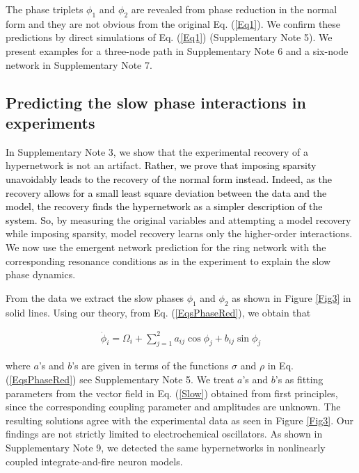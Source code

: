 \documentclass[12pt]{article}
\theoremstyle{plain}
\theoremstyle{definition}
\theoremstyle{remark}
\theoremstyle{remark}
\begin{document}
The phase triplets $\phi_1$ and  $\phi_2$ are  revealed from phase reduction in the normal form and  they are not obvious from the original Eq. (\ref{Eq1}). We confirm these  predictions by direct simulations of  Eq. (\ref{Eq1}) ({Supplementary Note 5}). We present examples for a three-node path in Supplementary Note 6 and a six-node network in Supplementary Note 7.


\subsection*{Predicting the slow phase interactions in experiments}

In {Supplementary Note 3}, we show that the experimental recovery of a hypernetwork is not an artifact. \textcolor{black}{Rather, we prove that imposing sparsity unavoidably leads to the recovery of the normal form instead. Indeed, as the recovery allows for a small least square deviation between the data and the model, the recovery finds the hypernetwork as a simpler description of the system. So,} by measuring the original variables and attempting a model recovery while imposing sparsity,  model recovery learns only the higher-order interactions. We now use the emergent network prediction for the ring network with the corresponding resonance conditions as in the experiment to explain the slow phase dynamics.

From the data we  extract the slow phases $\phi_1$ and $\phi_2$ as shown in Figure \ref{Fig3} in solid lines. Using our theory, from Eq. (\ref{EqsPhaseRed}), we obtain that
\begin{linenomath}
\begin{eqnarray}\label{Slow}
\dot{\phi}_i = \Omega_i + \sum_{j=1}^2 a_{ij} \cos \phi_j +  b_{ij} \sin \phi_j
\end{eqnarray}
\end{linenomath}
where  $a$'s and $b$'s are given in terms of the functions $\sigma$ and $\rho$ in Eq. (\ref{EqsPhaseRed}) see {Supplementary Note 5}.  We treat $a$'s  and $b$'s as fitting parameters from the vector field in Eq. (\ref{Slow}) obtained from first principles, since the corresponding coupling parameter and amplitudes are unknown. The resulting solutions agree  with the experimental data as seen in Figure \ref{Fig3}.  {\color{black} Our findings are not strictly limited to  electrochemical oscillators. As shown in  Supplementary Note 9, we detected the same hypernetworks in  nonlinearly coupled integrate-and-fire neuron models.}
\end{document}
